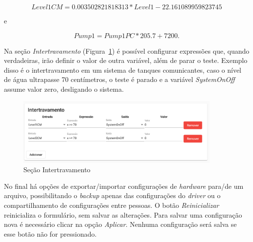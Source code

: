 \begin{equation*}
    Level1CM = 0.003502821818313*Level1 -22.161089959823745
\end{equation*}

e

\begin{equation*}
    Pump1 = Pump1PC * 205.7 + 7200.
\end{equation*}

Na seção \textit{Intertravamento} (Figura~\ref{fig:hardware5}) é possível
configurar expressões que, quando verdadeiras, irão definir o valor de outra
variável, além de parar o teste. Exemplo disso é o intertravamento em um sistema
de tanques comunicantes, caso o nível de água ultrapasse 70 centímetros, o teste
é parado e a variável \textit{SystemOnOff} assume valor zero, desligando o
sistema.

\begin{figure}[ht!]
    \centering
    \includegraphics[width=0.9\textwidth]{imgs/hardware5}
    \caption[Seção Intertravamento]{Seção Intertravamento}%
    \label{fig:hardware5}
\end{figure}

No final há opções de exportar/importar configurações de \textit{hardware}
para/de um arquivo, possibilitando o \textit{backup} apenas das configurações do
\textit{driver} ou o compartilhamento de configurações entre pessoas. O botão
\textit{Reinicializar} reinicializa o formulário, sem salvar as alterações. Para
salvar uma configuração nova é necessário clicar na opção \textit{Aplicar}.
Nenhuma configuração será salva se esse botão não for pressionado.

